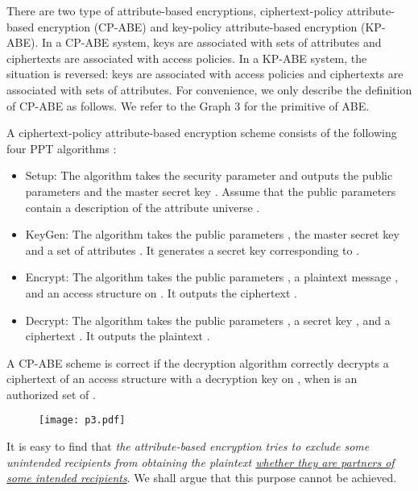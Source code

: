 \documentclass[11pt]{article}
\begin{document}
There are two type of attribute-based encryptions, ciphertext-policy attribute-based encryption
(CP-ABE) and key-policy attribute-based encryption (KP-ABE). In a CP-ABE system, keys are associated with sets of attributes and ciphertexts are associated with
access policies. In a KP-ABE system, the situation is reversed: keys are associated with access
policies and ciphertexts are associated with sets of attributes.
 For convenience, we only describe the definition of CP-ABE as follows.
We refer to the Graph 3 for the primitive  of ABE.


A ciphertext-policy attribute-based encryption scheme consists of the following four PPT algorithms \cite{RW12}:
\begin{itemize}
\item[] \textsf{Setup}: The algorithm takes the security parameter   and outputs the public parameters  and the master secret key . Assume that the public parameters
contain a description of the attribute universe .

\item[]   \textsf{KeyGen}: The algorithm takes  the public parameters ,
the master secret key  and a set of attributes .  It generates a secret key corresponding to .

\item[]  \textsf{Encrypt}: The  algorithm takes the public parameters , a
plaintext message , and an access structure  on . It outputs the ciphertext .

\item[]
  \textsf{Decrypt}: The algorithm takes  the public parameters , a
secret key , and a ciphertext . It outputs the plaintext .
\end{itemize}

A CP-ABE scheme is correct if the decryption algorithm correctly
decrypts a ciphertext of an access structure  with a decryption key on , when  is an authorized set of .

\begin{figure}[htbp]
\begin{minipage}[t]{.9\textwidth}
\hspace*{20mm}\texttt{[image: p3.pdf]}
  \end{minipage}
\end{figure}

 It is easy to find that  \emph{the attribute-based encryption tries to exclude some unintended recipients from obtaining the plaintext \underline{whether they are partners of some intended recipients}}. We shall argue that this purpose cannot be achieved.
\end{document}
